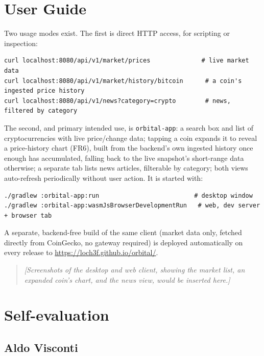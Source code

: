 \documentclass{scrartcl}
\begin{document}
\section{User Guide}\label{user-guide}

Two usage modes exist. The first is direct HTTP access, for scripting or inspection:

\begin{verbatim}
curl localhost:8080/api/v1/market/prices              # live market data
curl localhost:8080/api/v1/market/history/bitcoin      # a coin's ingested price history
curl localhost:8080/api/v1/news?category=crypto        # news, filtered by category
\end{verbatim}

The second, and primary intended use, is \texttt{orbital-app}: a search box and list of
cryptocurrencies with live price/change data; tapping a coin expands it to reveal a price-history
chart (FR6), built from the backend's own ingested history once enough has accumulated, falling
back to the live snapshot's short-range data otherwise; a separate tab lists news articles,
filterable by category; both views auto-refresh periodically without user action. It is started
with:

\begin{verbatim}
./gradlew :orbital-app:run                          # desktop window
./gradlew :orbital-app:wasmJsBrowserDevelopmentRun   # web, dev server + browser tab
\end{verbatim}

A separate, backend-free build of the same client (market data only, fetched directly from
CoinGecko, no gateway required) is deployed automatically on every release to
\url{https://loch3f.github.io/orbital/}.

\begin{quote}
\textit{[Screenshots of the desktop and web client, showing the market list, an expanded coin's
chart, and the news view, would be inserted here.]}
\end{quote}

\section{Self-evaluation}\label{self-evaluation}

\subsection{Aldo Visconti}\label{self-evaluation-aldo}
\end{document}
